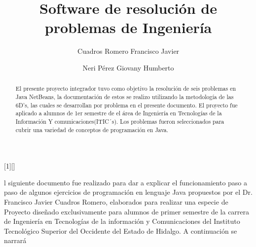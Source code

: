 \documentclass{IEEEcsmag}
\begin{document}
[1][]
{}
{}



\title{Software de resolución de problemas de Ingeniería }

\author{Cuadros Romero Francisco Javier}

\author{Neri Pérez Giovany Humberto}



\begin{abstract}
    El presente proyecto integrador tuvo como objetivo la resolución de seis problemas en Java NetBeans, la documentación de estos se 
    realizo utilizando la metodología de las 6D's, las cuales se desarrollan por problema en el presente documento. El proyecto fue aplicado a alumnos de 1er semestre de el área de Ingeniería en Tecnologías de la Información Y comunicaciones(ITIC´s).
    Los problemas fueron seleccionados para cubrir una variedad de conceptos de programación en Java.
\end{abstract}

\maketitle
{}l siguiente documento fue realizado para dar
a explicar el funcionamiento paso a paso de
algunos ejercicios de programación en lenguaje Java propuestos por el Dr. Francisco Javier Cuadros Romero, elaborados para realizar una especie
de Proyecto diseñado exclusivamente para alumnos
de primer semestre de la carrera de Ingeniería en
Tecnologías de la información y Comunicaciones del
Instituto Tecnológico Superior del Occidente del Estado de Hidalgo.
A continuación se narrará
\end{document}
